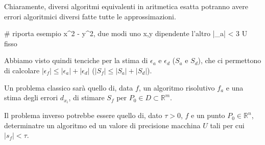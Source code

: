 \documentclass[a4paper,11pt]{article}
\begin{document}
Chiaramente, diversi algoritmi equivalenti in aritmetica esatta potranno avere errori algoritmici diversi fatte tutte le approssimazioni.

# riporta esempio x^2 - y^2, due modi uno x,y dipendente l'altro |\epsilon_a| < 3 U fisso

Abbiamo visto quindi tenciche per la stima di $\epsilon_a$ e $\epsilon_d$ ($S_a$ e $S_d$), che ci permettono di calcolare $|\epsilon_f| \leq |\epsilon_a| + |\epsilon_d|$ ($|S_f| \leq |S_a| + |S_d|$). 

Un problema classico sarà quello di, data $f$, un algoritmo risolutivo $f_a$ e una stima degli errori $d_{x_i}$, di stimare $S_f$ per $P_0 \in D \subset \mathbb{R}^m$.

Il problema inverso potrebbe essere quello di, dato $\tau > 0$, $f$ e un punto $P_0 \in \mathbb{R}^n$, determinatre un algoritmo ed un valore di precisione macchina $U$ tali per cui $|s_f| < \tau$.
\end{document}
